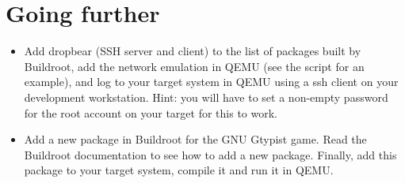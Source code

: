 
\section{Going further}

\begin{itemize}

\item Add dropbear (SSH server and client) to the list of packages
  built by Buildroot, add the network emulation in QEMU (see the
   script for an example), and log to
  your target system in QEMU using a ssh client on your development
  workstation. Hint: you will have to set a non-empty password for the
  root account on your target for this to work.

\item Add a new package in Buildroot for the GNU Gtypist game. Read
  the Buildroot documentation to see how to add a new
  package. Finally, add this package to your target system, compile it
  and run it in QEMU.

\end{itemize}
